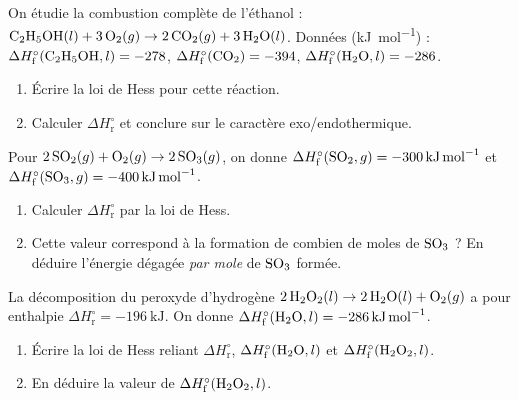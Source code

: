 \documentclass[11pt,a4paper]{article}
\newcommand{\dHr}{\Delta H^{\circ}_{\text{r}}}
\newcommand{\dHf}{\Delta H^{\circ}_{\text{f}}}
\begin{document}
\begin{center}
\end{center}

\begin{exercice}
On étudie la combustion complète de l'éthanol :
\;$\ce{C2H5OH}(l) + 3\,\ce{O2}(g) \rightarrow 2\,\ce{CO2}(g) + 3\,\ce{H2O}(l)$.\;
Données (\si{\kilo\joule\per\mol}) : $\dHf(\ce{C2H5OH},l)=-278$, $\dHf(\ce{CO2})=-394$, $\dHf(\ce{H2O},l)=-286$.
\begin{enumerate}[label=\alph*),leftmargin=2em,topsep=2pt,itemsep=2pt]
  \item Écrire la loi de Hess pour cette réaction.
  \item Calculer $\dHr$ et conclure sur le caractère exo/endothermique.
\end{enumerate}
\end{exercice}

\begin{exercice}
Pour \;$2\,\ce{SO2}(g) + \ce{O2}(g) \rightarrow 2\,\ce{SO3}(g)$,\; on donne
$\dHf(\ce{SO2},g)=\SI{-300}{\kilo\joule\per\mol}$ et $\dHf(\ce{SO3},g)=\SI{-400}{\kilo\joule\per\mol}$.
\begin{enumerate}[label=\alph*),leftmargin=2em,topsep=2pt,itemsep=2pt]
  \item Calculer $\dHr$ par la loi de Hess.
  \item Cette valeur correspond à la formation de combien de moles de $\ce{SO3}$ ?
        En déduire l'énergie dégagée \emph{par mole} de $\ce{SO3}$ formée.
\end{enumerate}
\end{exercice}

\begin{exercice}[remonter à un $\dHf$ inconnu]
La décomposition du peroxyde d'hydrogène \;$2\,\ce{H2O2}(l) \rightarrow 2\,\ce{H2O}(l) + \ce{O2}(g)$\;
a pour enthalpie $\dHr = \SI{-196}{\kilo\joule}$. On donne $\dHf(\ce{H2O},l)=\SI{-286}{\kilo\joule\per\mol}$.
\begin{enumerate}[label=\alph*),leftmargin=2em,topsep=2pt,itemsep=2pt]
  \item Écrire la loi de Hess reliant $\dHr$, $\dHf(\ce{H2O},l)$ et $\dHf(\ce{H2O2},l)$.
  \item En déduire la valeur de $\dHf(\ce{H2O2},l)$.
\end{enumerate}
\end{exercice}
\end{document}
